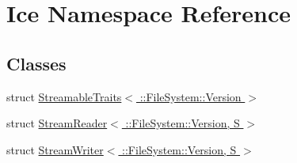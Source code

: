 \hypertarget{namespace_ice}{}\section{Ice Namespace Reference}
\label{namespace_ice}
\subsection*{Classes}
\begin{DoxyCompactItemize}
\item 
struct \hyperlink{struct_ice_1_1_streamable_traits_3_01_1_1_file_system_1_1_version_01_4}{Streamable\+Traits$<$ \+::\+File\+System\+::\+Version $>$}
\item 
struct \hyperlink{struct_ice_1_1_stream_reader_3_01_1_1_file_system_1_1_version_00_01_s_01_4}{Stream\+Reader$<$ \+::\+File\+System\+::\+Version, S $>$}
\item 
struct \hyperlink{struct_ice_1_1_stream_writer_3_01_1_1_file_system_1_1_version_00_01_s_01_4}{Stream\+Writer$<$ \+::\+File\+System\+::\+Version, S $>$}
\end{DoxyCompactItemize}
